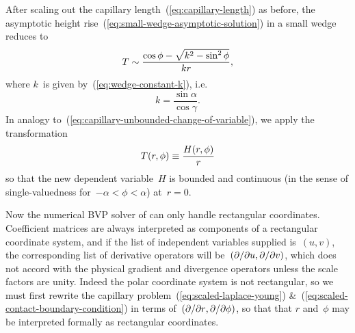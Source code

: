 After scaling out the capillary length~(\ref{eq:capillary-length})
as before,
the asymptotic height rise~(\ref{eq:small-wedge-asymptotic-solution})
in a small wedge reduces to
\begin{equation}
  T \sim \frac{\cos\phi - \sqrt{k^2 - \sin^2 \phi}}{k r},
  \label{eq:small-wedge-scaled-asymptotic-solution}
\end{equation}
where $k$~is given by~(\ref{eq:wedge-constant-k}), i.e.
\begin{equation}
  k = \frac{\sin\alpha}{\cos\gamma}.
  \label{eq:small-wedge-constant-k}
\end{equation}
In analogy to~(\ref{eq:capillary-unbounded-change-of-variable}),
we apply the transformation
\begin{equation}
  T (r, \phi) \equiv \frac{H (r, \phi)}{r}
  \label{eq:small-wedge-change-of-variable}
\end{equation}
so that the new dependent variable~$H$ is bounded and continuous
(in the sense of single-valuedness for~$-\alpha < \phi < \alpha$)
at~$r = 0$.

Now the numerical BVP solver of 
can only handle rectangular coordinates.
Coefficient matrices are always interpreted
as components of a rectangular coordinate system,
and if the list of independent variables supplied is~$(u, v)$,
the corresponding list of derivative operators
will be~$(\mathop{}\!\partial / {\mathop{}\!\partial u}, \mathop{}\!\partial / {\mathop{}\!\partial v})$,
which does not accord with
the physical gradient and divergence operators
unless the scale factors are unity.
Indeed the polar coordinate system is not rectangular,
so we must first rewrite the capillary problem~(\ref{eq:scaled-laplace-young})
\&~(\ref{eq:scaled-contact-boundary-condition})
in terms of~$(\mathop{}\!\partial / {\mathop{}\!\partial r}, \mathop{}\!\partial / {\mathop{}\!\partial\phi})$,
so that that $r$ and~$\phi$ may be interpreted formally
as rectangular coordinates.

